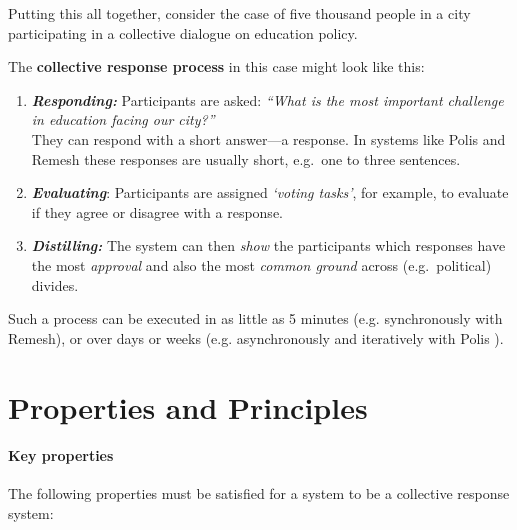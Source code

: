 \documentclass[sigconf,authorversion,nonacm,linkcolor=blue,colorlinks]{acmart}
\def\tightlist{} %
\begin{document}
\begin{example}
    
Putting this all together, consider the case of five thousand people in a city participating in a collective dialogue on education policy.

The \textbf{collective response process} in this case might look like this:
\begin{enumerate}
\def\labelenumi{\arabic{enumi}.}
\tightlist
\item
  \textbf{\emph{Responding:}} Participants are asked: \emph{``What is the most important challenge in education facing our city?''}
  \\ They can respond with a short answer---a response. In systems like Polis \cite{smallPolis2021} and Remesh \cite{RemeshWebsite} these responses are usually short, e.g.~one to three sentences.
\item
  \textbf{\emph{Evaluating}}: Participants are assigned \emph{`voting tasks'}, for example, to evaluate if they agree or disagree with a response.
\item
  \textbf{\emph{Distilling:}} The system can then \emph{show} the participants which responses have the most \emph{approval} and also the most \emph{common ground} across (e.g.~political) divides.
\end{enumerate}

Such a process can be executed in as little as 5 minutes (e.g. synchronously with Remesh), or over days or weeks (e.g. asynchronously and iteratively with Polis \cite{smallPolis2021}).
\end{example}

\hypertarget{system-design-properties-and-principles}{%
\section{Properties and Principles}\label{system-design-properties-and-principles}}

\paragraph{Key properties} The following properties must be satisfied for a system to be a collective response system:
\end{document}
